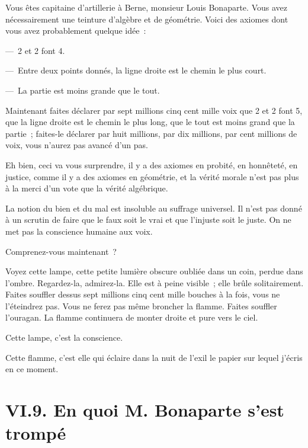\documentclass[french,twoside]{book} %
\begin{document}
\noindent Vous êtes capitaine d’artillerie à Berne, monsieur Louis Bonaparte. Vous avez nécessairement une teinture d’algèbre et de géométrie. Voici des axiomes dont vous avez probablement quelque idée :\par
— 2 et 2 font 4.\par
— Entre deux points donnés, la ligne droite est le chemin le plus court.\par
— La partie est moins grande que le tout.\par
Maintenant faites déclarer par sept millions cinq cent mille voix que 2 et 2 font 5, que la ligne droite est le chemin le plus long, que le tout est moins grand que la partie ; faites-le déclarer par huit millions, par dix millions, par cent millions de voix, vous n’aurez pas avancé d’un pas.\par
Eh bien, ceci va vous surprendre, il y a des axiomes en probité, en honnêteté, en justice, comme il y a des axiomes en géométrie, et la vérité morale n’est pas plus à la merci d’un vote que la vérité algébrique.\par
La notion du bien et du mal est insoluble au suffrage universel. Il n’est pas donné à un scrutin de faire que le faux soit le vrai et que l’injuste soit le juste. On ne met pas la conscience humaine aux voix.\par
Comprenez-vous maintenant ?\par
Voyez cette lampe, cette petite lumière obscure oubliée dans un coin, perdue dans l’ombre. Regardez-la, admirez-la. Elle est à peine visible ; elle brûle solitairement. Faites souffler dessus sept millions cinq cent mille bouches à la fois, vous ne l’éteindrez pas. Vous ne ferez pas même broncher la flamme. Faites souffler l’ouragan. La flamme continuera de monter droite et pure vers le ciel.\par
Cette lampe, c’est la conscience.\par
Cette flamme, c’est elle qui éclaire dans la nuit de l’exil le papier sur lequel j’écris en ce moment.

\section[{VI.9. En quoi M. Bonaparte s’est trompé}]{VI.9. En quoi M. Bonaparte s’est trompé}
\end{document}

